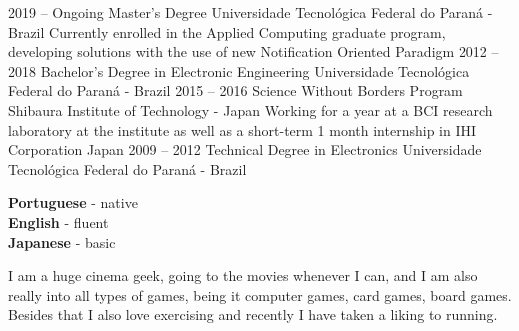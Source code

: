 \documentclass[9pt]{developercv} %
\begin{document}


\begin{entrylist}
	\entry
		{2019 -- Ongoing}
		{Master's Degree}
		{Universidade Tecnológica Federal do Paraná - Brazil}
		{Currently enrolled in the Applied Computing graduate program, developing solutions
		with the use of new Notification Oriented Paradigm}
	\entry
		{2012 -- 2018}
		{Bachelor's Degree in Electronic Engineering}
		{Universidade Tecnológica Federal do Paraná - Brazil}
		{}
	\entry
		{2015 -- 2016}
		{Science Without Borders Program}
		{Shibaura Institute of Technology - Japan}
		{Working for a year at a BCI research laboratory at the institute as well as a short-term
		1 month internship in IHI Corporation Japan}
	\entry
		{2009 -- 2012}
		{Technical Degree in Electronics}
		{Universidade Tecnológica Federal do Paraná - Brazil}
		{}
\end{entrylist}


\begin{minipage}[t]{0.3\textwidth}
	\vspace{-\baselineskip} %

	
	\textbf{Portuguese} - native\\
	\textbf{English} - fluent\\
	\textbf{Japanese} - basic
\end{minipage}
\hfill
\begin{minipage}[t]{0.7\textwidth}
	\vspace{-\baselineskip} %
	

	I am a huge cinema geek, going to the movies whenever I can, and I am also really into all
	types of games, being it computer games, card games, board games. Besides that I also love 
	exercising and recently I have taken a liking to running.
\end{minipage}


\end{document}
